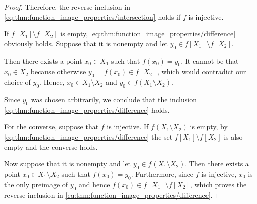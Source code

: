 \begin{proof}
  Therefore, the reverse inclusion in \eqref{eq:thm:function_image_properties/intersection} holds if \( f \) is injective.

   If \( f[X_1] \setminus f[X_2] \) is empty, \eqref{eq:thm:function_image_properties/difference} obviously holds. Suppose that it is nonempty and let \( y_0 \in f[X_1] \setminus f[X_2] \).

  Then there exists a point \( x_0 \in X_1 \) such that \( f(x_0) = y_0 \). It cannot be that \( x_0 \in X_2 \) because otherwise \( y_0 = f(x_0) \in f[X_2] \), which would contradict our choice of \( y_0 \). Hence, \( x_0 \in X_1 \setminus X_2 \) and \( y_0 \in f(X_1 \setminus X_2) \).

  Since \( y_0 \) was chosen arbitrarily, we conclude that the inclusion \eqref{eq:thm:function_image_properties/difference} holds.

  For the converse, suppose that \( f \) is injective. If \( f(X_1 \setminus X_2) \) is empty, by \eqref{eq:thm:function_image_properties/difference} the set \( f[X_1] \setminus f[X_2] \) is also empty and the converse holds.

  Now suppose that it is nonempty and let \( y_0 \in f(X_1 \setminus X_2) \). Then there exists a point \( x_0 \in X_1 \setminus X_2 \) such that \( f(x_0) = y_0 \). Furthermore, since \( f \) is injective, \( x_0 \) is the only preimage of \( y_0 \) and hence \( f(x_0) \in f[X_1] \setminus f[X_2] \), which proves the reverse inclusion in \eqref{eq:thm:function_image_properties/difference}.
\end{proof}

